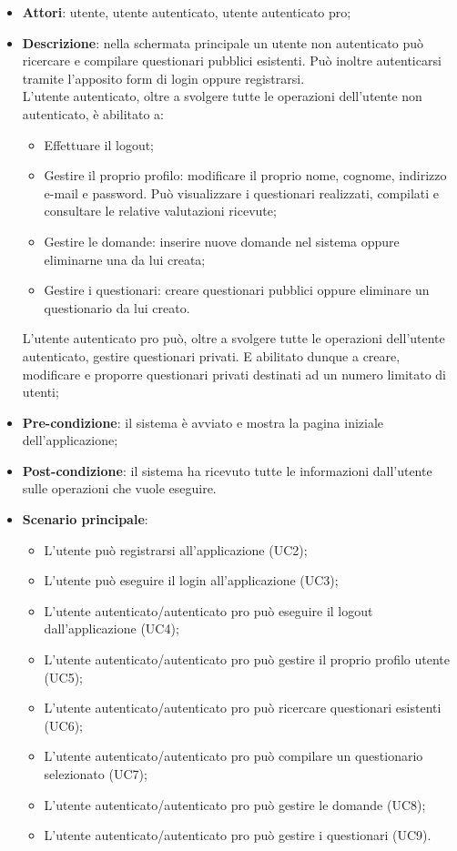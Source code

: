 \begin{itemize}
\item\textbf{Attori}: utente, utente autenticato, utente autenticato pro;
\item\textbf{Descrizione}: nella schermata principale un utente non autenticato può ricercare e compilare questionari pubblici esistenti. Può inoltre autenticarsi tramite l'apposito form di login oppure registrarsi.\\
L'utente autenticato, oltre a svolgere tutte le operazioni dell'utente non autenticato, è abilitato a:
\begin{itemize}
\item Effettuare il logout;
\item Gestire il proprio profilo: modificare il proprio nome, cognome, indirizzo e-mail e password. Può visualizzare i questionari realizzati, compilati e consultare le relative valutazioni ricevute;
\item Gestire le domande: inserire nuove domande nel sistema oppure eliminarne una da lui creata;
\item Gestire i questionari: creare questionari pubblici oppure eliminare un questionario da lui creato.
\end{itemize}

L'utente autenticato pro può, oltre a svolgere tutte le operazioni dell'utente autenticato, gestire questionari privati. E abilitato dunque a creare, modificare e proporre questionari privati destinati ad un numero limitato di utenti;
\item\textbf{Pre-condizione}: il sistema è avviato e mostra la pagina iniziale dell'applicazione;
\item\textbf{Post-condizione}: il sistema ha ricevuto tutte le informazioni dall'utente sulle operazioni che vuole eseguire.
\item\textbf{Scenario principale}:
\begin{itemize}
\item L'utente può registrarsi all'applicazione (UC2);
\item L'utente può eseguire il login all'applicazione (UC3);
\item L'utente autenticato/autenticato pro può eseguire il logout dall'applicazione (UC4); 
\item L'utente autenticato/autenticato pro può gestire il proprio profilo utente (UC5);
\item L'utente autenticato/autenticato pro può ricercare questionari esistenti (UC6);
\item L'utente autenticato/autenticato pro può compilare un questionario  selezionato (UC7);
\item L'utente autenticato/autenticato pro può gestire le domande (UC8);
\item L'utente autenticato/autenticato pro può gestire i questionari (UC9).
\end{itemize}
\end{itemize}